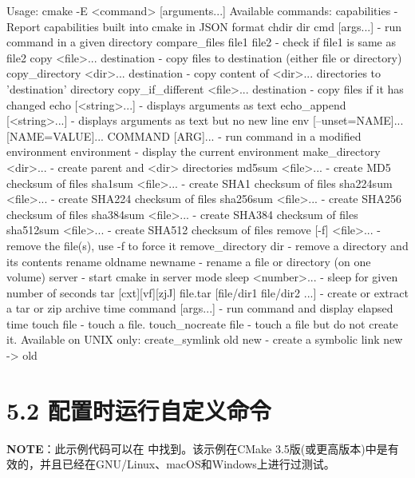 \begin{codebox}[shell]
Usage: cmake -E <command> [arguments...]
Available commands:
  capabilities              - Report capabilities built into cmake in JSON format
  chdir dir cmd [args...]   - run command in a given directory
  compare_files file1 file2 - check if file1 is same as file2
  copy <file>... destination  - copy files to destination (either file or directory)
  copy_directory <dir>... destination   - copy content of <dir>... directories to 'destination' directory
  copy_if_different <file>... destination  - copy files if it has changed
  echo [<string>...]        - displays arguments as text
  echo_append [<string>...] - displays arguments as text but no new line
  env [--unset=NAME]... [NAME=VALUE]... COMMAND [ARG]...
                            - run command in a modified environment
  environment               - display the current environment
  make_directory <dir>...   - create parent and <dir> directories
  md5sum <file>...          - create MD5 checksum of files
  sha1sum <file>...         - create SHA1 checksum of files
  sha224sum <file>...       - create SHA224 checksum of files
  sha256sum <file>...       - create SHA256 checksum of files
  sha384sum <file>...       - create SHA384 checksum of files
  sha512sum <file>...       - create SHA512 checksum of files
  remove [-f] <file>...     - remove the file(s), use -f to force it
  remove_directory dir      - remove a directory and its contents
  rename oldname newname    - rename a file or directory (on one volume)
  server                    - start cmake in server mode
  sleep <number>...         - sleep for given number of seconds
  tar [cxt][vf][zjJ] file.tar [file/dir1 file/dir2 ...]
                            - create or extract a tar or zip archive
  time command [args...]    - run command and display elapsed time
  touch file                - touch a file.
  touch_nocreate file       - touch a file but do not create it.
Available on UNIX only:
  create_symlink old new    - create a symbolic link new -> old
\end{codebox}


\section{5.2 配置时运行自定义命令}

\begin{myInfoBox}
\textbf{NOTE}：此示例代码可以在  中找到。该示例在CMake 3.5版(或更高版本)中是有效的，并且已经在GNU/Linux、macOS和Windows上进行过测试。
\end{myInfoBox}

